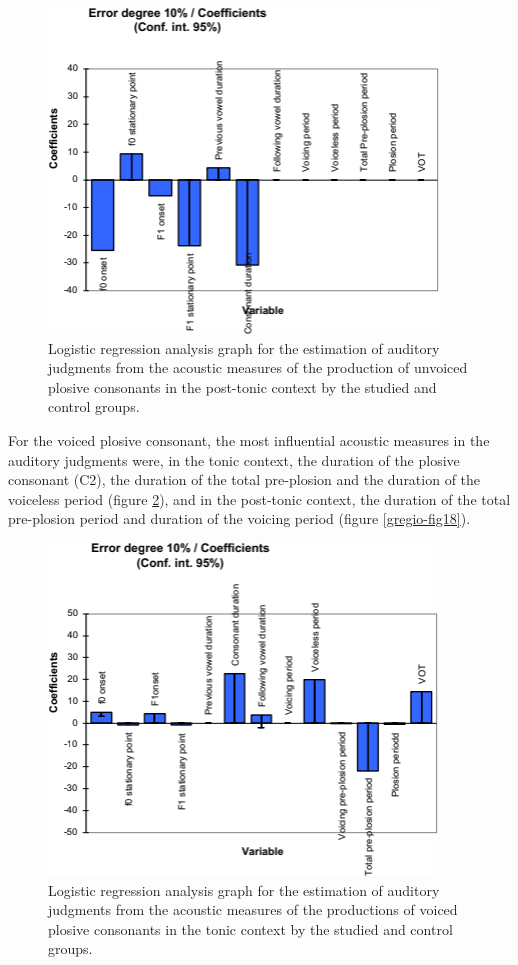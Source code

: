 \begin{figure}
\centering
\includegraphics[width=0.9\linewidth]{imgs/gregio-image16.png}
\caption{Logistic regression analysis graph for the estimation of auditory judgments from the acoustic measures of the production of unvoiced plosive consonants in the post-tonic context by the studied and control groups.} 
\label{gregio-fig16}
\end{figure}

For the voiced plosive consonant, the most influential acoustic measures in the
auditory judgments were, in the tonic context, the duration of the plosive
consonant (C2), the duration of the total pre-plosion and the duration of the
voiceless period (figure \ref{gregio-fig17}), and in the post-tonic context, the duration of
the total pre-plosion period and duration of the voicing period (figure \ref{gregio-fig18}).

\begin{figure}
\centering
\includegraphics[width=0.9\linewidth]{imgs/gregio-image17.png}
\caption{Logistic regression analysis graph for the estimation of auditory judgments from the acoustic measures of the productions of voiced plosive consonants in the tonic context by the studied and control groups.} 
\label{gregio-fig17}
\end{figure}

